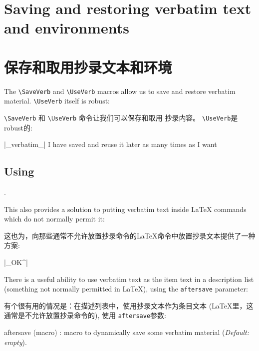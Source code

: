 \documentclass[twoside]{article}
\newcommand\cs[1]{\texttt{\textbackslash#1}}
\providecommand\optname[1]{\textsf{#1}}
\newenvironment{optlist}{\begin{description}%
  \renewcommand\makelabel[1]{%
    \descriptionlabel{\mdseries\optname{##1}}}%
  \itemsep0.25\itemsep}%
 {\end{description}}
\newcommand\verbatimTxt{抄录}
\begin{document}
\section{Saving and restoring verbatim text and environments}
\section{保存和取用{\verbatimTxt}文本和环境}


  The \cs{SaveVerb} and \cs{UseVerb} macros allow us to save and restore
verbatim material. \cs{UseVerb} itself is robust:

\cs{SaveVerb} 和 \cs{UseVerb} 命令让我们可以保存和取用
{\verbatimTxt}内容。 \cs{UseVerb}是robust的:

%  \DefineShortVerb{\|}
%  \SaveVerb{Verb}|_verbatim_|
\begin{SideBySideExample}
  \DefineShortVerb{\|}
  |_verbatim_|
  I have saved  and reuse 
  it later as many times as I want
  \subsection*{Using }
  .
\end{SideBySideExample}


  This also provides a solution to putting verbatim text inside \LaTeX{}
commands which do not normally permit it: %

  这也为，向那些通常不允许放置抄录命令的\LaTeX{}命令中放置抄录文本提供了一种方案: %

{
\begin{Example}
  \DefineShortVerb{\|}|_OK^| 
\end{Example}
}

  There is a useful ability to use verbatim text as the item text in a
description list (something not normally permitted in \LaTeX), using the
\texttt{aftersave} parameter:

  有个很有用的情况是：在描述列表中，使用抄录文本作为条目文本
 (\LaTeX 里，这通常是不允许放置抄录命令的), 使用
\texttt{aftersave}参数:

\begin{optlist}
  \item[aftersave (macro)]: macro to dynamically save some verbatim material
  (\emph{Default: empty}).
\end{optlist}
\end{document}
